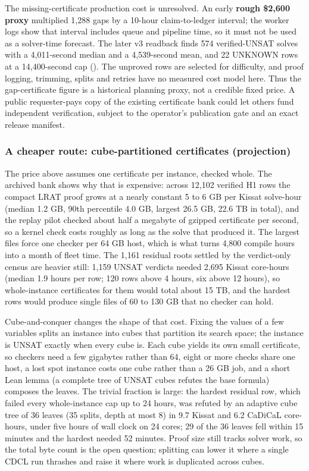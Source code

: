 \documentclass{anvil-paper}
\renewcommand{\texttt}[1]{\path{#1}}
\begin{document}
The missing-certificate production cost is unresolved. An early \textbf{rough \$2,600 proxy} multiplied 1,288 gaps by a 10-hour claim-to-ledger interval; the worker logs show that interval includes queue and pipeline time, so it must not be used as a solver-time forecast. The later v3 readback finds 574 verified-UNSAT solves with a 4,011-second median and a 4,539-second mean, and 22 UNKNOWN rows at a 14,400-second cap (\texttt{sat49/H1\_V3\_SOLVER\_TIMING\_20260916.md}). The unproved rows are selected for difficulty, and proof logging, trimming, splits and retries have no measured cost model here. Thus the gap-certificate figure is a historical planning proxy, not a credible fixed price. A public requester-pays copy of the existing certificate bank could let others fund independent verification, subject to the operator's publication gate and an exact release manifest.

\subsubsection{A cheaper route: cube-partitioned certificates (projection)}\label{a-cheaper-route-cube-partitioned-certificates-projection}

The price above assumes one certificate per instance, checked whole. The archived bank shows why that is expensive: across 12,102 verified H1 rows the compact LRAT proof grows at a nearly constant 5 to 6 GB per Kissat solve-hour (median 1.2 GB, 90th percentile 4.0 GB, largest 26.5 GB, 22.6 TB in total), and the replay pilot checked about half a megabyte of gzipped certificate per second, so a kernel check costs roughly as long as the solve that produced it. The largest files force one checker per 64 GB host, which is what turns 4,800 compile hours into a month of fleet time. The 1,161 residual roots settled by the verdict-only census are heavier still: 1,159 UNSAT verdicts needed 2,695 Kissat core-hours (median 1.9 hours per row; 120 rows above 4 hours, six above 12 hours), so whole-instance certificates for them would total about 15 TB, and the hardest rows would produce single files of 60 to 130 GB that no checker can hold.

Cube-and-conquer changes the shape of that cost. Fixing the values of a few variables splits an instance into cubes that partition its search space; the instance is UNSAT exactly when every cube is. Each cube yields its own small certificate, so checkers need a few gigabytes rather than 64, eight or more checks share one host, a lost spot instance costs one cube rather than a 26 GB job, and a short Lean lemma (a complete tree of UNSAT cubes refutes the base formula) composes the leaves. The trivial fraction is large: the hardest residual row, which failed every whole-instance cap up to 24 hours, was refuted by an adaptive cube tree of 36 leaves (35 splits, depth at most 8) in 9.7 Kissat and 6.2 CaDiCaL core-hours, under five hours of wall clock on 24 cores; 29 of the 36 leaves fell within 15 minutes and the hardest needed 52 minutes. Proof size still tracks solver work, so the total byte count is the open question; splitting can lower it where a single CDCL run thrashes and raise it where work is duplicated across cubes.
\end{document}
